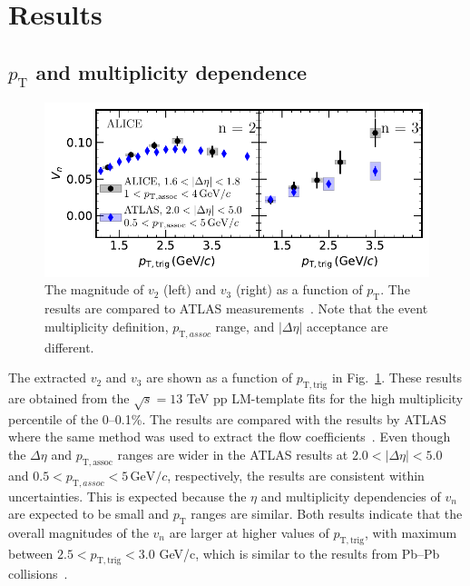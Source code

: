 
\section {Results}
\label{sec:results}
\subsection{$p_{\mathrm{T}}$ and multiplicity dependence}

\begin{figure}[h!]
	\centering
	\includegraphics[width=0.99 \textwidth]{figures/Fig2_vn.pdf} 
	\caption{The magnitude of $v_2$ (left) and $v_3$ (right) as a function of $p_\mathrm{T}$. The results are compared to ATLAS measurements~\cite{ATLAS:2016yzd}. Note that the event multiplicity definition, $p_{\mathrm{T},assoc}$ range, and $|\Delta\eta|$ acceptance are different.}
	\label{fig:vn}
\end{figure}

The extracted $v_2$ and $v_3$ are shown as a function of $p_{\mathrm{T},\mathrm{trig}}$ in Fig.~\ref{fig:vn}. These results are obtained from the $\sqrt{s}=13$ TeV pp LM-template fits for the high multiplicity percentile of the 0--0.1\%. The results are compared with the results by ATLAS where the same method was used to extract the flow coefficients~\cite{ATLAS:2016yzd}. Even though the $\Delta\eta$ and $p_{\mathrm{T},\mathrm{assoc}}$ ranges are wider in the ATLAS results at $2.0<|\Delta\eta|<5.0$ and $0.5<p_{\mathrm{T},assoc}<5\,\mathrm{GeV}/c$, respectively, the results are consistent within uncertainties. This is expected because the $\eta$ and multiplicity dependencies of $v_n$ are expected to be small and $p_{\mathrm{T}}$ ranges are similar. Both results indicate that the overall magnitudes of the $v_n$ are larger at higher values of $p_{\mathrm{T},\mathrm{trig}}$, with maximum between $2.5<p_{\mathrm{T},\mathrm{trig}}<3.0$ GeV/c, which is similar to the results from Pb--Pb collisions~\cite{ALICE:2018yph}.

